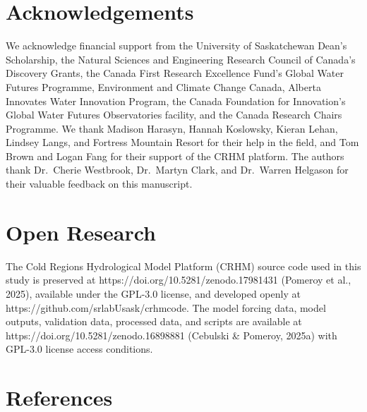 \documentclass[
]{agujournal2019}
\begin{document}
\section{Acknowledgements}\label{acknowledgements}

We acknowledge financial support from the University of Saskatchewan
Dean's Scholarship, the Natural Sciences and Engineering Research
Council of Canada's Discovery Grants, the Canada First Research
Excellence Fund's Global Water Futures Programme, Environment and
Climate Change Canada, Alberta Innovates Water Innovation Program, the
Canada Foundation for Innovation's Global Water Futures Observatories
facility, and the Canada Research Chairs Programme. We thank Madison
Harasyn, Hannah Koslowsky, Kieran Lehan, Lindsey Langs, and Fortress
Mountain Resort for their help in the field, and Tom Brown and Logan
Fang for their support of the CRHM platform. The authors thank
Dr.~Cherie Westbrook, Dr.~Martyn Clark, and Dr.~Warren Helgason for
their valuable feedback on this manuscript.

\section{Open Research}\label{open-research}

The Cold Regions Hydrological Model Platform (CRHM) source code used in
this study is preserved at https://doi.org/10.5281/zenodo.17981431
(Pomeroy et al., 2025), available under the GPL-3.0 license, and
developed openly at https://github.com/srlabUsask/crhmcode. The model
forcing data, model outputs, validation data, processed data, and
scripts are available at https://doi.org/10.5281/zenodo.16898881
(Cebulski \& Pomeroy, 2025a) with GPL-3.0 license access conditions.

\pagebreak

\section*{References}\label{references}
\end{document}
